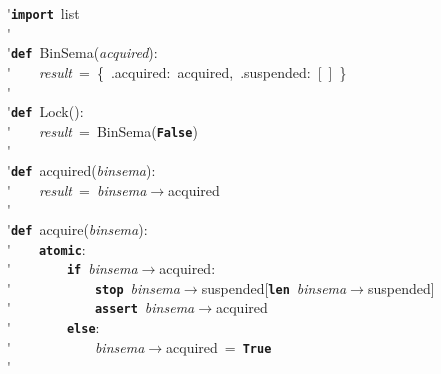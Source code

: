 \'\>\texttt{\textbf{import}}~list\\

\'\>\\

\'\>\texttt{\textbf{def}}~BinSema(\textit{acquired}):\\

\'\>~~~~\textit{result}~=~\{~.acquired:~acquired,~.suspended:~[~]~\}\\

\'\>\\

\'\>\texttt{\textbf{def}}~Lock():\\

\'\>~~~~\textit{result}~=~BinSema(\texttt{\textbf{False}})\\

\'\>\\

\'\>\texttt{\textbf{def}}~acquired(\textit{binsema}):\\

\'\>~~~~\textit{result}~=~\textit{binsema}$\rightarrow$acquired\\

\'\>\\

\'\>\texttt{\textbf{def}}~acquire(\textit{binsema}):\\

\'\>~~~~\texttt{\textbf{atomic}}:\\

\'\>~~~~~~~~\texttt{\textbf{if}}~\textit{binsema}$\rightarrow$acquired:\\

\'\>~~~~~~~~~~~~\texttt{\textbf{stop}}~\textit{binsema}$\rightarrow$suspended[\texttt{\textbf{len}}~\textit{binsema}$\rightarrow$suspended]\\

\'\>~~~~~~~~~~~~\texttt{\textbf{assert}}~\textit{binsema}$\rightarrow$acquired\\

\'\>~~~~~~~~\texttt{\textbf{else}}:\\

\'\>~~~~~~~~~~~~\textit{binsema}$\rightarrow$acquired~=~\texttt{\textbf{True}}\\

\'\>\\


